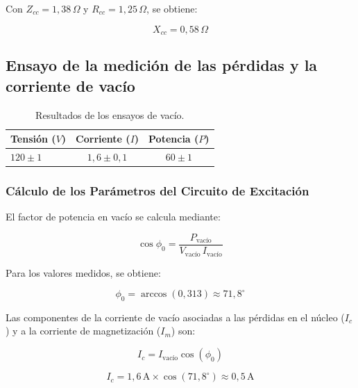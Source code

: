 Con $Z_{cc}=1,38\,\Omega$ y $R_{cc}=1,25\,\Omega$, se obtiene:

\begin{equation}
X_{cc}=0,58\,\Omega
\end{equation}


\subsection{Ensayo de la medición de las pérdidas y la corriente de vacío}

\begin{table}[H]
\centering
\caption{Resultados de los ensayos de vacío.}
\renewcommand{\arraystretch}{1.3}
\begin{tabular}{lcc}
\toprule
\textbf{Tensión ($V$)} & \textbf{Corriente ($I$)} & \textbf{Potencia ($P$)} \\
\midrule
$120 \pm 1$ & $1,6 \pm 0,1$ & $60 \pm 1$ \\
\bottomrule
\end{tabular}
\end{table}

\subsubsection*{Cálculo de los Parámetros del Circuito de Excitación}

El factor de potencia en vacío se calcula mediante:

\begin{equation}
\cos\phi_0=\frac{P_{\text{vacío}}}{V_{\text{vacío}}\,I_{\text{vacío}}}
\tag{7.10}
\end{equation}

Para los valores medidos, se obtiene:

\begin{equation}
\phi_0=\arccos(0,313)\approx 71,8^{\circ}
\tag{7.11}
\end{equation}

Las componentes de la corriente de vacío asociadas a las pérdidas en el núcleo ($I_c$) y a la corriente de magnetización ($I_m$) son:

\begin{equation}
I_c=I_{\text{vacío}}\cos(\phi_0)
\end{equation}

\begin{equation}
I_c=1,6\,\mathrm{A}\times\cos(71,8^{\circ})\approx 0,5\,\mathrm{A}
\end{equation}

